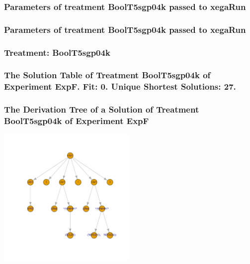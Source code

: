 \documentclass[18pt,c]{beamer}
\begin{document}

 \begin{frame}
 \fontsize{8pt}{9pt}\selectfont
 \frametitle{  Parameters of treatment BoolT5sgp04k passed to xegaRun
 }

 \label{ExpFtParmTable010.tex}  
 \end{frame}


 \begin{frame}
 \fontsize{8pt}{9pt}\selectfont
 \frametitle{  Parameters of treatment BoolT5sgp04k passed to xegaRun
 }

 \label{ExpFtParmTable011.tex}  
 \end{frame}

 \begin{frame}
 \fontsize{8pt}{9pt}\selectfont
 \frametitle{ Treatment: BoolT5sgp04k }

 \label{ExpFStatsTable008.tex}  
 \end{frame}

 \begin{frame}
 \fontsize{8pt}{9pt}\selectfont
 \frametitle{ The Solution Table of Treatment BoolT5sgp04k of Experiment ExpF. Fit: 0. Unique Shortest Solutions: 27. }

 \label{ExpFSolutionTable002.tex}  
 \end{frame}

 \begin{frame}
 \frametitle{ The Derivation Tree of a Solution of Treatment BoolT5sgp04k of Experiment ExpF }
 \begin{center}
\includegraphics[width=0.5\textwidth, angle=0]
{ExpFDerivationTreeFigure002.pdf}
 \end{center}
 \label{report/ExpFDerivationTreeFigure002.pdf}  
 \end{frame}
\end{document}
